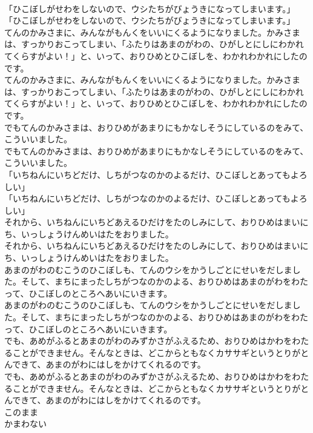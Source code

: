 \documentclass[8pt]{extreport}
\begin{document}
\begin{CJK}{UTF8}{min}
\\	「ひこぼしがせわをしないので、ウシたちがびょうきになってしまいます。」	
\\	「ひこぼしがせわをしないので、ウシたちがびょうきになってしまいます。」 
\\	てんのかみさまに、みんながもんくをいいにくるようになりました。かみさまは、すっかりおこってしまい、「ふたりはあまのがわの、ひがしとにしにわかれてくらすがよい！」と、いって、おりひめとひこぼしを、わかれわかれにしたのです。	
\\	てんのかみさまに、みんながもんくをいいにくるようになりました。かみさまは、すっかりおこってしまい、「ふたりはあまのがわの、ひがしとにしにわかれてくらすがよい！」と、いって、おりひめとひこぼしを、わかれわかれにしたのです。 
\\	でもてんのかみさまは、おりひめがあまりにもかなしそうにしているのをみて、こういいました。	
\\	でもてんのかみさまは、おりひめがあまりにもかなしそうにしているのをみて、こういいました。 
\\	「いちねんにいちどだけ、しちがつなのかのよるだけ、ひこぼしとあってもよろしい」	
\\	「いちねんにいちどだけ、しちがつなのかのよるだけ、ひこぼしとあってもよろしい」 
\\	それから、いちねんにいちどあえるひだけをたのしみにして、おりひめはまいにち、いっしょうけんめいはたをおりました。	
\\	それから、いちねんにいちどあえるひだけをたのしみにして、おりひめはまいにち、いっしょうけんめいはたをおりました。 
\\	あまのがわのむこうのひこぼしも、てんのウシをかうしごとにせいをだしました。そして、まちにまったしちがつなのかのよる、おりひめはあまのがわをわたって、ひこぼしのところへあいにいきます。	
\\	あまのがわのむこうのひこぼしも、てんのウシをかうしごとにせいをだしました。そして、まちにまったしちがつなのかのよる、おりひめはあまのがわをわたって、ひこぼしのところへあいにいきます。 
\\	でも、あめがふるとあまのがわのみずかさがふえるため、おりひめはかわをわたることができません。そんなときは、どこからともなくカササギというとりがとんできて、あまのがわにはしをかけてくれるのです。	
\\	でも、あめがふるとあまのがわのみずかさがふえるため、おりひめはかわをわたることができません。そんなときは、どこからともなくカササギというとりがとんできて、あまのがわにはしをかけてくれるのです。 
\\	このまま
\\	かまわない

\end{CJK}
\end{document}
